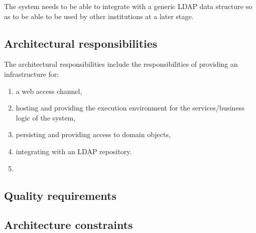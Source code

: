 \documentclass[11pt,a4paper]{article}
\begin{document}
The system needs to be able to integrate with a generic LDAP data structure so as to be able to be used by other institutions at a later stage.

	\subsection{Architectural responsibilities}
	The architectural responsibilities include the responsibilities of providing an infrastructure for:
	\begin{enumerate}
		\item a web access channel,
		\item hosting and providing the execution environment for the services/business logic of the system,
		\item persisting and providing access to domain objects,
		\item integrating with an LDAP repository.
		\item 
	\end{enumerate}
		 
	\subsection{Quality requirements}
		 
	\subsection{ Architecture constraints}
 
\end{document}
